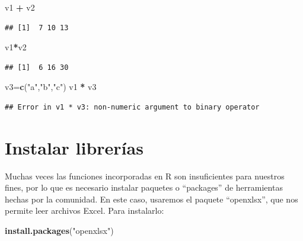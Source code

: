 \documentclass[
]{book}
\newenvironment{Shaded}{\begin{snugshade}}{\end{snugshade}}
\newcommand{\FunctionTok}[1]{\textcolor[rgb]{0.13,0.29,0.53}{\textbf{#1}}}
\newcommand{\NormalTok}[1]{#1}
\newcommand{\OtherTok}[1]{\textcolor[rgb]{0.56,0.35,0.01}{#1}}
\newcommand{\SpecialCharTok}[1]{\textcolor[rgb]{0.81,0.36,0.00}{\textbf{#1}}}
\newcommand{\StringTok}[1]{\textcolor[rgb]{0.31,0.60,0.02}{#1}}
\begin{document}
\begin{Shaded}
\begin{Highlighting}[]
\NormalTok{v1 }\SpecialCharTok{+}\NormalTok{ v2}
\end{Highlighting}
\end{Shaded}

\begin{verbatim}
## [1]  7 10 13
\end{verbatim}

\begin{Shaded}
\begin{Highlighting}[]
\NormalTok{v1}\SpecialCharTok{*}\NormalTok{v2}
\end{Highlighting}
\end{Shaded}

\begin{verbatim}
## [1]  6 16 30
\end{verbatim}

\begin{Shaded}
\begin{Highlighting}[]
\NormalTok{v3}\OtherTok{=}\FunctionTok{c}\NormalTok{(}\StringTok{"a"}\NormalTok{,}\StringTok{"b"}\NormalTok{,}\StringTok{"c"}\NormalTok{)}
\NormalTok{v1 }\SpecialCharTok{*}\NormalTok{ v3}
\end{Highlighting}
\end{Shaded}

\begin{verbatim}
## Error in v1 * v3: non-numeric argument to binary operator
\end{verbatim}

\hypertarget{instalar-libreruxedas}{%
\section{Instalar librerías}\label{instalar-libreruxedas}}

Muchas veces las funciones incorporadas en R son insuficientes para
nuestros fines, por lo que es necesario instalar paquetes o ``packages''
de herramientas hechas por la comunidad. En este caso, usaremos el
paquete ``openxlsx'', que nos permite leer archivos Excel. Para
instalarlo:

\begin{Shaded}
\begin{Highlighting}[]
\FunctionTok{install.packages}\NormalTok{(}\StringTok{"openxlsx"}\NormalTok{)}
\end{Highlighting}
\end{Shaded}
\end{document}
